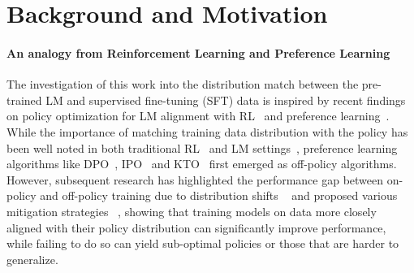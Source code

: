 \section{Background and Motivation}
\label{sec:motivation}

\paragraph{An analogy from Reinforcement Learning and Preference Learning}

The investigation of this work into the distribution match between the pre-trained LM and supervised fine-tuning (SFT) data is inspired by recent findings on policy optimization for LM alignment with RL~\cite{ouyang2022training} and preference learning~\cite{rafailov2023dpo,ethayarajh2024kto}. 
While the importance of matching training data distribution with the  policy has been well noted in both traditional RL~\cite{shi2023offlinereinforcementlearningonpolicy,fujimoto2018offpolicy,kumar2019offpolicy,peng2019offpolicy,wang2021criticregularizedregression,arora2023theory,jiang2016doublyrobustoffpolicyvalue,tang2010importancesampling} and LM settings~\cite{xiong2024iterative}, preference learning algorithms like DPO~\cite{rafailov2023dpo}, IPO~\cite{azar2023ipo} and KTO~\cite{ethayarajh2024kto} first emerged as off-policy algorithms. 
However, subsequent research has highlighted the performance gap between on-policy and off-policy training due to distribution shifts ~\cite{xu2024dposuperiorppollm,tang2024understandingperformancegaponline} and proposed various mitigation strategies ~\cite{zhuang2023bpo,zhou2024wpoenhancingrlhfweighted,zhang2024textbfplumimprovingcodelms,xiong2024iterative,guo2024onlineaifeedback}, showing that training models on data more closely aligned with their policy distribution can significantly improve performance, while failing to do so can yield sub-optimal policies or those that are harder to generalize. 
